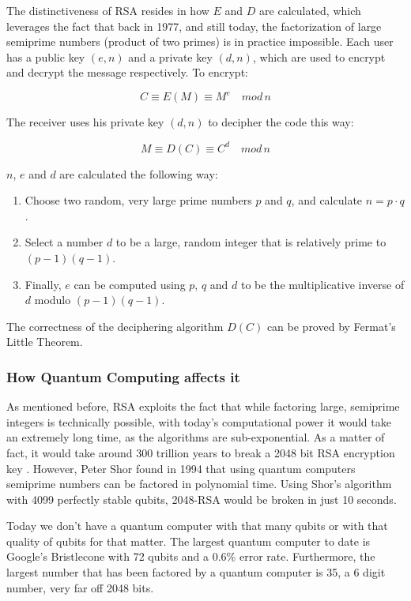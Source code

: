 The distinctiveness of RSA resides in how $E$ and $D$ are calculated, which
leverages the fact that back in 1977, and still today, the factorization of
large semiprime numbers (product of two primes) is in practice impossible. Each
user has a public key $(e, n)$ and a private key $(d,n)$, which are used to encrypt
and decrypt the message respectively. To encrypt:

\begin{equation}
    C \equiv E(M) \equiv M^e \quad mod \, n
\end{equation}

The receiver uses his private key $(d,n)$ to decipher the code this way:

\begin{equation}
    M \equiv D(C) \equiv C^d \quad mod \, n
\end{equation}

$n$, $e$ and $d$ are calculated the following way:
\begin{enumerate}
    \item Choose two random, very large prime numbers $p$ and $q$, and calculate $n = p \cdot q$.
    \item Select a number $d$ to be a large, random integer that is relatively prime to $(p-1)(q-1)$.
    \item Finally, $e$ can be computed using $p$, $q$ and $d$ to be the multiplicative inverse of $d$ modulo $(p-1)(q-1)$.
\end{enumerate}

The correctness of the deciphering algorithm $D(C)$ can be proved by Fermat's Little Theorem.

\subsubsection{How Quantum Computing affects it}

As mentioned before, RSA exploits the fact that while factoring large,
semiprime integers is technically possible, with today’s computational
power it would take an extremely long time, as the algorithms are
sub-exponential. As a matter of fact, it would take around 300 trillion
years to break a 2048 bit RSA encryption key
\cite{andreas_baumhof_breaking_2019}. However, Peter Shor found
in 1994 that using quantum computers semiprime numbers can be factored
in polynomial time. Using Shor’s algorithm with 4099 perfectly stable
qubits, 2048-RSA would be broken in just 10 seconds.

Today we don’t have a quantum computer with that many qubits or with
that quality of qubits for that matter. The largest quantum computer to
date is Google’s Bristlecone with 72 qubits and a 0.6\% error rate.
Furthermore, the largest number that has been factored by a quantum
computer is 35, a 6 digit number, very far off 2048 bits.

